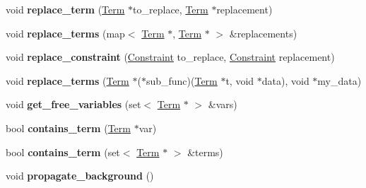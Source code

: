 \begin{DoxyCompactItemize}
\item 
\hypertarget{classConstraint_a24eec2aa82235b851666c629df196f0a}{void {\bfseries replace\-\_\-term} (\hyperlink{classTerm}{\-Term} $\ast$to\-\_\-replace, \hyperlink{classTerm}{\-Term} $\ast$replacement)}\label{classConstraint_a24eec2aa82235b851666c629df196f0a}

\item 
\hypertarget{classConstraint_af9b206b82a008a4af7e1b575dc7d8ca7}{void {\bfseries replace\-\_\-terms} (map$<$ \hyperlink{classTerm}{\-Term} $\ast$, \hyperlink{classTerm}{\-Term} $\ast$ $>$ \&replacements)}\label{classConstraint_af9b206b82a008a4af7e1b575dc7d8ca7}

\item 
\hypertarget{classConstraint_a138adfd683910b897168e9e70fa10e42}{void {\bfseries replace\-\_\-constraint} (\hyperlink{classConstraint}{\-Constraint} to\-\_\-replace, \hyperlink{classConstraint}{\-Constraint} replacement)}\label{classConstraint_a138adfd683910b897168e9e70fa10e42}

\item 
\hypertarget{classConstraint_a81f4c55b35512008e41e3b5aeb1aa5e5}{void {\bfseries replace\-\_\-terms} (\hyperlink{classTerm}{\-Term} $\ast$($\ast$sub\-\_\-func)(\hyperlink{classTerm}{\-Term} $\ast$t, void $\ast$data), void $\ast$my\-\_\-data)}\label{classConstraint_a81f4c55b35512008e41e3b5aeb1aa5e5}

\item 
\hypertarget{classConstraint_ae1b1ebed8a9e9f7bee72831e047da334}{void {\bfseries get\-\_\-free\-\_\-variables} (set$<$ \hyperlink{classTerm}{\-Term} $\ast$ $>$ \&vars)}\label{classConstraint_ae1b1ebed8a9e9f7bee72831e047da334}

\item 
\hypertarget{classConstraint_a1d322a2774d5ec8b8c93c900dae0d984}{bool {\bfseries contains\-\_\-term} (\hyperlink{classTerm}{\-Term} $\ast$var)}\label{classConstraint_a1d322a2774d5ec8b8c93c900dae0d984}

\item 
\hypertarget{classConstraint_a2675221c52142359f0d76c9f84939352}{bool {\bfseries contains\-\_\-term} (set$<$ \hyperlink{classTerm}{\-Term} $\ast$ $>$ \&terms)}\label{classConstraint_a2675221c52142359f0d76c9f84939352}

\item 
\hypertarget{classConstraint_ae84415110bd11a02a9f1be31808e546d}{void {\bfseries propagate\-\_\-background} ()}\label{classConstraint_ae84415110bd11a02a9f1be31808e546d}


\end{DoxyCompactItemize}
